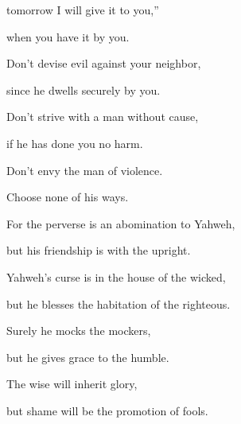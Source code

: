 {\par }{\QB tomorrow I will give it to you,”
\par }{\QB when you have it by you.
\par }{\Q {}Don’t devise evil against your neighbor,
\par }{\QB since he dwells securely by you.
\par }{\Q {}Don’t strive with a man without cause,
\par }{\QB if he has done you no harm.
\par }{\Q {}Don’t envy the man of violence.
\par }{\QB Choose none of his ways.
\par }{\Q {}For the perverse is an abomination to Yahweh,
\par }{\QB but his friendship is with the upright.
\par }{\Q {}Yahweh’s curse is in the house of the wicked,
\par }{\QB but he blesses the habitation of the righteous.
\par }{\Q {}Surely he mocks the mockers,
\par }{\QB but he gives grace to the humble.
\par }{\Q {}The wise will inherit glory,
\par }{\QB but shame will be the promotion of fools.

}
